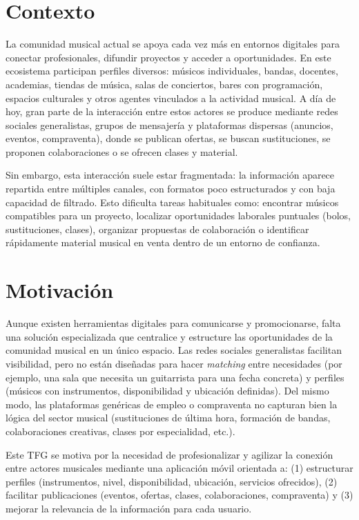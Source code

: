 \documentclass[12pt,a4paper]{report}
\begin{document}
\section{Contexto}
La comunidad musical actual se apoya cada vez más en entornos digitales para conectar profesionales, difundir proyectos y acceder a oportunidades. En este ecosistema participan perfiles diversos: músicos individuales, bandas, docentes, academias, tiendas de música, salas de conciertos, bares con programación, espacios culturales y otros agentes vinculados a la actividad musical. A día de hoy, gran parte de la interacción entre estos actores se produce mediante redes sociales generalistas, grupos de mensajería y plataformas dispersas (anuncios, eventos, compraventa), donde se publican ofertas, se buscan sustituciones, se proponen colaboraciones o se ofrecen clases y material.

Sin embargo, esta interacción suele estar fragmentada: la información aparece repartida entre múltiples canales, con formatos poco estructurados y con baja capacidad de filtrado. Esto dificulta tareas habituales como: encontrar músicos compatibles para un proyecto, localizar oportunidades laborales puntuales (bolos, sustituciones, clases), organizar propuestas de colaboración o identificar rápidamente material musical en venta dentro de un entorno de confianza.

\section{Motivación}
Aunque existen herramientas digitales para comunicarse y promocionarse, falta una solución especializada que centralice y estructure las oportunidades de la comunidad musical en un único espacio. Las redes sociales generalistas facilitan visibilidad, pero no están diseñadas para hacer \textit{matching} entre necesidades (por ejemplo, una sala que necesita un guitarrista para una fecha concreta) y perfiles (músicos con instrumentos, disponibilidad y ubicación definidas). Del mismo modo, las plataformas genéricas de empleo o compraventa no capturan bien la lógica del sector musical (sustituciones de última hora, formación de bandas, colaboraciones creativas, clases por especialidad, etc.).

Este TFG se motiva por la necesidad de profesionalizar y agilizar la conexión entre actores musicales mediante una aplicación móvil orientada a: (1) estructurar perfiles (instrumentos, nivel, disponibilidad, ubicación, servicios ofrecidos), (2) facilitar publicaciones (eventos, ofertas, clases, colaboraciones, compraventa) y (3) mejorar la relevancia de la información para cada usuario.
\end{document}
